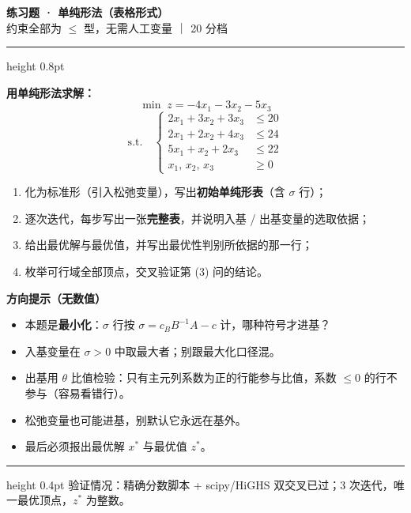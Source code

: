 \documentclass[11pt]{ctexart}
\begin{document}
\begin{center}
{\Large\bfseries 练习题 · 单纯形法（表格形式）}\\[4pt]
{\small\color{mygray}约束全部为 $\leq$ 型，无需人工变量 ｜ 20 分档}
\end{center}
\vspace{-2pt}
\hrule height 0.8pt
\vspace{10pt}

\textbf{用单纯形法求解：}
\[
\min\; z = -4x_1 - 3x_2 - 5x_3
\]
\[
\text{s.t.}\quad
\left\{
\begin{aligned}
2x_1 + 3x_2 + 3x_3 &\leq 20\\
2x_1 + 2x_2 + 4x_3 &\leq 24\\
5x_1 + x_2 + 2x_3 &\leq 22\\
x_1,\,x_2,\,x_3 &\geq 0
\end{aligned}
\right.
\]

\vspace{6pt}
\begin{enumerate}
\item 化为标准形（引入松弛变量），写出\textbf{初始单纯形表}（含 $\sigma$ 行）；
\item 逐次迭代，每步写出一张\textbf{完整表}，并说明入基 / 出基变量的选取依据；
\item 给出最优解与最优值，并写出最优性判别所依据的那一行；
\item 枚举可行域全部顶点，交叉验证第 (3) 问的结论。
\end{enumerate}

\vspace{4pt}
\textbf{方向提示（无数值）}
\begin{itemize}\setlength{\itemsep}{2pt}
\item 本题是\textbf{最小化}：$\sigma$ 行按 $\sigma = c_B B^{-1} A - c$ 计，哪种符号才进基？
\item 入基变量在 $\sigma > 0$ 中取最大者；别跟最大化口径混。
\item 出基用 $\theta$ 比值检验：只有主元列系数为正的行能参与比值，系数 $\leq 0$ 的行不参与（容易看错行）。
\item 松弛变量也可能进基，别默认它永远在基外。
\item 最后必须报出最优解 $x^{*}$ 与最优值 $z^{*}$。
\end{itemize}

\vspace{10pt}
\hrule height 0.4pt
\vspace{4pt}
{\small\color{mygray}验证情况：精确分数脚本 + scipy/HiGHS 双交叉已过；3 次迭代，唯一最优顶点，$z^{*}$ 为整数。}
\end{document}
